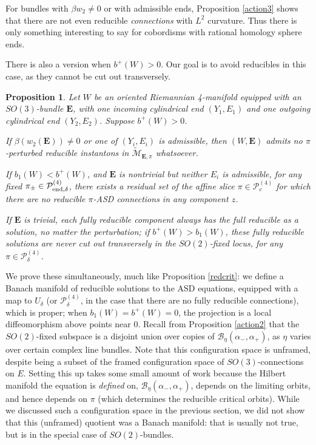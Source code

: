 \documentclass[10pt,a4paper]{amsart}
\newtheorem{proposition}[theorem]{Proposition}
\theoremstyle{definition}
\theoremstyle{remark}
\numberwithin{figure}{qchap}
\begin{document}
For bundles with $\beta w_2 \neq 0$ or with admissible ends, Proposition \ref{action3} shows that there are not even reducible \emph{connections} with $L^2$ curvature. Thus there is only something interesting to say for cobordisms with rational homology sphere ends.

There is also a version when $b^+(W) > 0$. Our goal is to avoid reducibles in this case, as they cannot be cut out transversely.

\begin{proposition}\label{red-bplus-pos}Let $W$ be an oriented Riemannian 4-manifold equipped with an $SO(3)$-bundle $\mathbf{E}$, with one incoming cylindrical end $(Y_1,E_1)$ and one outgoing cylindrical end $(Y_2, E_2)$. Suppose $b^+(W) > 0$.

If $\beta(w_2(\mathbf{E})) \neq 0$ or one of $(Y_i, E_i)$ is admissible, then $(W,\mathbf{E})$ admits no $\pi$-perturbed reducible instantons in $\widetilde{\mathcal M}_{\mathbf{E},\pi}$ whatsoever.

If $b_1(W) < b^+(W)$, and $\mathbf{E}$ is nontrivial but neither $E_i$ is admissible, for any fixed $\pi_\pm \in \mathcal P^{(4)}_{\textup{end},\delta}$, there exists a residual set of the affine slice $\pi \in \mathcal P^{(4)}_{c}$ for which there are no reducible $\pi$-ASD connections in any component $z$.

If $\mathbf{E}$ is trivial, each fully reducible component always has the full reducible as a solution, no matter the perturbation; if $b^+(W) > b_1(W)$, these fully reducible solutions are never cut out transversely in the $SO(2)$-fixed locus, for any $\pi \in \mathcal P^{(4)}_{\delta}$.
\end{proposition}

We prove these simultaneously, much like Proposition \ref{redcrit}: we define a Banach manifold of reducible solutions to the ASD equations, equipped with a map to $U_\delta$ (or $\mathcal P^{(4)}_\delta$, in the case that there are no fully reducible connections), which is proper; when $b_1(W) = b^+(W) = 0$, the projection is a local diffeomorphism above points near $0$. Recall from Proposition \ref{action2} that the $SO(2)$-fixed subspace is a disjoint union over copies of $\mathcal B_{\eta}(\alpha_-, \alpha_+)$, as $\eta$ varies over certain complex line bundles. Note that this configuration space is unframed, despite being a subset of the framed configuration space of $SO(3)$-connections on $E$. Setting this up takes some small amount of work because the Hilbert manifold the equation is \emph{defined} on, $\mathcal{B}_{\eta}(\alpha_-, \alpha_+)$, depends on the limiting orbits, and hence depends on $\pi$ (which determines the reducible critical orbits). While we discussed such a configuration space in the previous section, we did not show that this (unframed) quotient was a Banach manifold: that is usually not true, but is in the special case of $SO(2)$-bundles.
\end{document}

